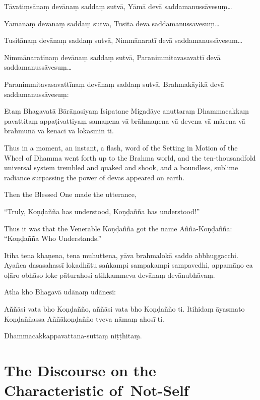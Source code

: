 Tāvatiṃsānaṃ devānaṃ saddaṃ sutvā, Yāmā devā saddamanussāvesuṃ\ldots

Yāmānaṃ devānaṃ saddaṃ sutvā, Tusitā devā saddamanussāvesuṃ\ldots

Tusitānaṃ devānaṃ saddaṃ sutvā, Nimmānaratī devā saddamanussāvesum\ldots

Nimmānaratīnaṃ devānaṃ saddaṃ sutvā, Paranimmitavasavattī devā
saddamanussāvesuṃ\ldots

Paranimmitavasavattīnaṃ devānaṃ saddaṃ sutvā, Brahmakāyikā devā
saddamanussāvesuṃ:

Etaṃ Bhagavatā Bārāṇasiyaṃ Isipatane Migadāye anuttaraṃ Dhammacakkaṃ
pavattitaṃ appaṭivattiyaṃ samaṇena vā brāhmaṇena vā devena vā mārena vā
brahmunā vā kenaci vā lokasmin ti.

\clearpage

\englishText

Thus in a moment, an instant, a flash, word of the Setting in Motion of
the Wheel of Dhamma went forth up to the Brahma world, and the
ten-thousandfold universal system trembled and quaked and shook, and a
boundless, sublime radiance surpassing the power of devas appeared on
earth.

Then the Blessed One made the utterance,

``Truly, Koṇḍañña has understood, Koṇḍañña has understood!''

Thus it was that the Venerable Koṇḍañña got the name Aññā-Koṇḍañña:
``Koṇḍañña Who Understands.''

\clearpage

\paliText

Itiha tena khaṇena, tena muhuttena, yāva brahmalokā saddo abbhuggacchi.
Ayañca dasasahassī lokadhātu saṅkampi sampakampi sampavedhi, appamāṇo ca
oḷāro obhāso loke pāturahosi atikkammeva devānaṃ devānubhāvaṃ.

Atha kho Bhagavā udānaṃ udānesi:

Aññāsi vata bho Koṇḍañño, aññāsi vata bho Koṇḍañño ti. Itihidaṃ āyasmato
Koṇḍaññassa Aññākoṇḍañño tveva nāmaṃ ahosī ti.

Dhammacakkappavattana-suttaṃ niṭṭhitaṃ.

\chapter[Characteristic of Not-Self]{The Discourse on the Characteristic of~Not-Self}%

\englishText

